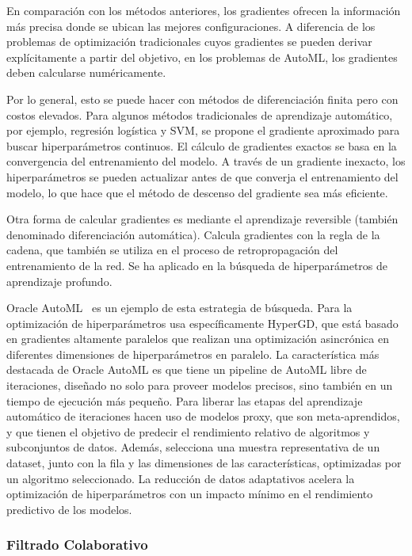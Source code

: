 En comparación con los métodos anteriores, los gradientes ofrecen la información más precisa donde se ubican las mejores configuraciones. A diferencia de los problemas de optimización tradicionales cuyos gradientes se pueden derivar explícitamente a partir del objetivo, en los problemas de AutoML, los gradientes deben calcularse numéricamente.

Por lo general, esto se puede hacer con métodos de diferenciación finita pero con costos elevados. Para algunos métodos tradicionales de aprendizaje automático, por ejemplo, regresión logística y SVM, se propone el gradiente aproximado para buscar hiperparámetros continuos. El cálculo de gradientes exactos se basa en la convergencia del entrenamiento del modelo. A través de un gradiente inexacto, los hiperparámetros se pueden actualizar antes de que converja el entrenamiento del modelo, lo que hace que el método de descenso del gradiente sea más eficiente.

Otra forma de calcular gradientes es mediante el aprendizaje reversible \cite{maclaurin2015gradient} (también denominado diferenciación automática). Calcula gradientes con la regla de la cadena, que también se utiliza en el proceso de retropropagación del entrenamiento de la red. Se ha aplicado en la búsqueda de hiperparámetros de aprendizaje profundo. 

Oracle AutoML~\cite{OracleAutoML} es un ejemplo de esta estrategia de búsqueda. Para la optimización de hiperparámetros usa específicamente HyperGD, que está basado en gradientes altamente paralelos que realizan una optimización asincrónica en diferentes dimensiones de hiperparámetros en paralelo. La característica más destacada de Oracle AutoML es que tiene un pipeline de AutoML libre de iteraciones, diseñado no solo para proveer modelos precisos, sino también en un tiempo de ejecución más pequeño. Para liberar las etapas del aprendizaje automático de iteraciones hacen uso de modelos proxy, que son meta-aprendidos, y que tienen el objetivo de predecir el rendimiento relativo de algoritmos y subconjuntos de datos. Además, selecciona una muestra representativa de un dataset, junto con la fila y las dimensiones de las características, optimizadas por un algoritmo seleccionado. La reducción de datos adaptativos acelera la optimización de hiperparámetros con un impacto mínimo en el rendimiento predictivo de los modelos.

\subsubsection{Filtrado Colaborativo}

